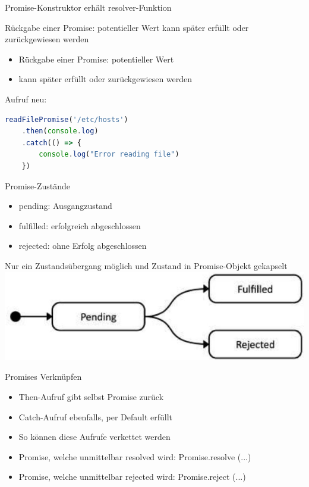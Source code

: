 \begin{concept}{Promise-Konstruktor erhält resolver-Funktion}

Rückgabe einer Promise: potentieller Wert kann später erfüllt oder zurückgewiesen werden
\begin{itemize}
  \item Rückgabe einer Promise: potentieller Wert
  \item kann später erfüllt oder zurückgewiesen werden
\end{itemize}
Aufruf neu:
\begin{lstlisting}[language=JavaScript, style=basesmol]
readFilePromise('/etc/hosts')
    .then(console.log)
    .catch(() => {
        console.log("Error reading file")
    })
\end{lstlisting}
\end{concept}

\begin{theorem}{Promise-Zustände}
\begin{itemize}
  \item pending: Ausgangzustand
  \item fulfilled: erfolgreich abgeschlossen
  \item rejected: ohne Erfolg abgeschlossen
  \end{itemize}
  Nur ein Zustandsübergang möglich und Zustand in Promise-Objekt gekapselt\\
\includegraphics[width=0.8\linewidth]{images/2024_12_29_858f09cde51177c71657g-14}
\end{theorem}

\begin{corollary}{Promises Verknüpfen}
\begin{itemize}
  \item Then-Aufruf gibt selbst Promise zurück
  \item Catch-Aufruf ebenfalls, per Default erfüllt
  \item So können diese Aufrufe verkettet werden
  \item Promise, welche unmittelbar resolved wird: Promise.resolve (...)
  \item Promise, welche unmittelbar rejected wird: Promise.reject (...)
\end{itemize}
\end{corollary}

